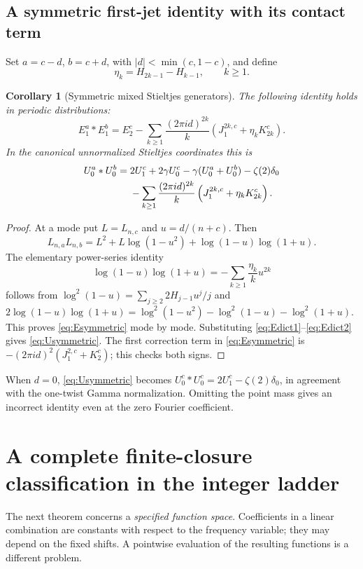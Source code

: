 \documentclass[11pt,a4paper]{article}
\numberwithin{equation}{section}
\newtheorem{corollary}[theorem]{Corollary}
\theoremstyle{definition}\newtheorem{definition}[theorem]{Definition}
\theoremstyle{remark}\newtheorem{remark}[theorem]{Remark}
\begin{document}
\subsection{A symmetric first-jet identity with its contact term}
Set $a=c-d$, $b=c+d$, with $|d|<\min(c,1-c)$, and define
\begin{equation}
 \eta_k=H_{2k-1}-H_{k-1},\qquad k\ge1.
 \label{eq:etak}
\end{equation}

\begin{corollary}[Symmetric mixed Stieltjes generators]\label{cor:symmetric}
The following identity holds in periodic distributions:
\begin{equation}
 E_1^a*E_1^b=E_2^c-
  \sum_{k\ge1}\frac{(2\pi i d)^{2k}}k
       \left(J_1^{2k,c}+\eta_kK_{2k}^c\right).
 \label{eq:Esymmetric}
\end{equation}
In the canonical unnormalized Stieltjes coordinates this is
\begin{align}
 U_0^a*U_0^b={}&2U_1^c+2\gamma U_0^c
          -\gamma(U_0^a+U_0^b)-\zeta(2)\delta_0\notag\\
 &-\sum_{k\ge1}\frac{(2\pi i d)^{2k}}k
       \left(J_1^{2k,c}+\eta_kK_{2k}^c\right).
 \label{eq:Usymmetric}
\end{align}
\end{corollary}
\begin{proof}
At a mode put $L=L_{n,c}$ and $u=d/(n+c)$. Then
\[
 L_{n,a}L_{n,b}=L^2+L\log(1-u^2)
                       +\log(1-u)\log(1+u).
\]
The elementary power-series identity
\begin{equation}
 \log(1-u)\log(1+u)
       =-\sum_{k\ge1}\frac{\eta_k}{k}u^{2k}
 \label{eq:logproduct}
\end{equation}
follows from
$\log^2(1-u)=\sum_{j\ge2}2H_{j-1}u^j/j$ and
$2\log(1-u)\log(1+u)=\log^2(1-u^2)-\log^2(1-u)-\log^2(1+u)$.
This proves \eqref{eq:Esymmetric} mode by mode. Substituting
\eqref{eq:Edict1}--\eqref{eq:Edict2} gives \eqref{eq:Usymmetric}.
The first correction term in \eqref{eq:Esymmetric} is
$-(2\pi id)^2(J_1^{2,c}+K_2^c)$; this checks both signs.
\end{proof}

When $d=0$, \eqref{eq:Usymmetric} becomes
$U_0^c*U_0^c=2U_1^c-\zeta(2)\delta_0$, in agreement with the
one-twist Gamma normalization. Omitting the point mass gives an
incorrect identity even at the zero Fourier coefficient.

\section{A complete finite-closure classification in the integer ladder}
\label{sec:obstruction}
The next theorem concerns a \emph{specified function space}. Coefficients
in a linear combination are constants with respect to the frequency
variable; they may depend on the fixed shifts. A pointwise evaluation
of the resulting functions is a different problem.
\end{document}
